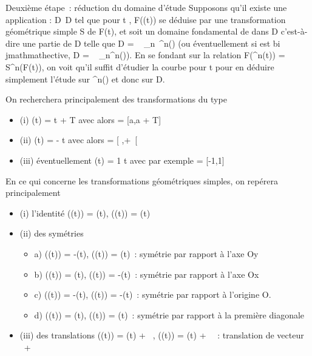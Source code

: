 \documentclass[]{article}
\begin{document}
Deuxième étape~: réduction du domaine d'étude Supposons qu'il existe une
application \theta : D\rightarrow~D tel que pour t \inD, F(\theta(t)) se déduise par une
transformation géométrique simple S de F(t), et soit \Delta un domaine
fondamental de \theta dans D c'est-à-dire une partie de D telle que D
= \⋃ ~
_n\in{}~\theta^n(\Delta) (ou éventuellement si \theta est bi\\jmathmathective, D
= \⋃ ~
_n\in{}\theta^n(\Delta)). En se fondant sur la relation
F(\theta^n(t)) = S^n(F(t)), on voit qu'il suffit
d'étudier la courbe pour t \in \Delta pour en déduire simplement l'étude sur
\theta^n(\Delta) et donc sur D.

On recherchera principalement des transformations \theta du type

\begin{itemize}
\itemsep1pt\parskip0pt
\item
  (i) \theta(t) = t + T avec alors \Delta = {[}a,a + T{]} \bigcapD
\item
  (ii) \theta(t) = \omega - t avec alors \Delta = {[} \omega {}
  ,+\infty~{[}\bigcapD
\item
  (iii) éventuellement \theta(t) = 1 \over t avec par
  exemple \Delta = {[}-1,1{]} \bigcapD
\end{itemize}

En ce qui concerne les transformations géométriques simples, on repérera
principalement

\begin{itemize}
\itemsep1pt\parskip0pt
\item
  (i) l'identité \phi(\theta(t)) = \phi(t), \psi(\theta(t)) = \psi(t)
\item
  (ii) des symétries

  \begin{itemize}
  \itemsep1pt\parskip0pt
  \item
    a) \phi(\theta(t)) = -\phi(t), \psi(\theta(t)) = \psi(t)~: symétrie par rapport à l'axe Oy
  \item
    b) \phi(\theta(t)) = \phi(t), \psi(\theta(t)) = -\psi(t)~: symétrie par rapport à l'axe Ox
  \item
    c) \phi(\theta(t)) = -\phi(t), \psi(\theta(t)) = -\psi(t)~: symétrie par rapport à
    l'origine O.
  \item
    d) \phi(\theta(t)) = \psi(t), \psi(\theta(t)) = \phi(t)~: symétrie par rapport à la
    première diagonale
  \end{itemize}
\item
  (iii) des translations \phi(\theta(t)) = \phi(t) + \alpha~, \psi(\theta(t)) = \psi(t) + \beta~~:
  translation de vecteur \alpha~\vec\imath +
  \beta~
\end{itemize}
\end{document}
